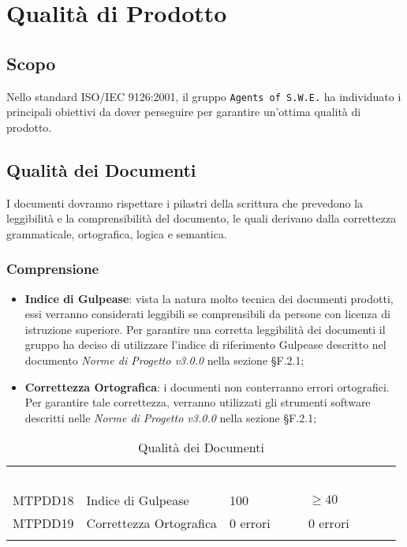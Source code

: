 \section{Qualità di Prodotto}
\label{qualitaProdotto}

\subsection{Scopo}

Nello standard ISO/IEC 9126:2001, il gruppo \texttt{Agents of S.W.E.} ha individuato i principali obiettivi da dover perseguire per garantire un'ottima qualità di prodotto.  

\subsection{Qualità dei Documenti}

I documenti dovranno rispettare i pilastri della scrittura che prevedono la leggibilità e la comprensibilità del documento, le quali derivano dalla correttezza grammaticale, ortografica, logica e semantica.

\subsubsection{Comprensione}

\begin{itemize}
	\item \textbf{Indice di Gulpease}: vista la natura molto tecnica dei documenti prodotti, essi verranno considerati leggibili se comprensibili da persone con licenza di istruzione superiore. Per garantire una corretta leggibilità dei documenti il gruppo ha deciso di utilizzare l'indice di riferimento Gulpease descritto nel documento \textit{Norme di Progetto v3.0.0} nella sezione §F.2.1;
	
	\item \textbf{Correttezza Ortografica}: i documenti non conterranno errori ortografici. Per garantire tale correttezza, verranno utilizzati gli strumenti software descritti nelle \textit{Norme di Progetto v3.0.0} nella sezione §F.2.1;
	
\end{itemize}

\begin{longtable}{|C{.15\textwidth}|C{.24\textwidth}|C{.24\textwidth}|C{.24\textwidth}|}
\hline
{}\textbf{\textcolor{white}{ID}} & \textbf{\textcolor{white}{Nome}} & \textbf{\textcolor{white}{Ottimalità}} & \textbf{\textcolor{white}{Accettabilità}}\\
MTPDD18 & Indice di Gulpease & 100 & $\geq 40$ \\
\hline
{}MTPDD19 & Correttezza Ortografica & 0 errori & 0 errori \\ 
\hline
\caption{Qualità dei Documenti}
\label{QualitàDocumenti}
\end{longtable}

